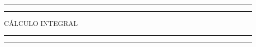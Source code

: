 \newcommand{\plogo}{\fbox{$\mathcal{PL}$}} %

\begin{titlepage} %

    \centering %

    \scshape %

    \vspace*{\baselineskip} %


    \rule{\textwidth}{1.6pt}\vspace*{-\baselineskip}\vspace*{2pt} %
    \rule{\textwidth}{0.4pt} %

    \vspace{0.75\baselineskip} %

    {\LARGE CÁLCULO INTEGRAL\\} %

    \vspace{0.75\baselineskip} %

    \rule{\textwidth}{0.4pt}\vspace*{-\baselineskip}\vspace{3.2pt} %
    \rule{\textwidth}{1.6pt} %

    \vspace{2\baselineskip} %



    \vspace*{3\baselineskip} %




    \vspace{1.5\baselineskip} %


\end{titlepage}
